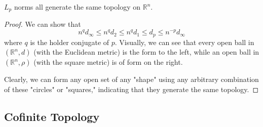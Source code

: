   \begin{theorem}
    $L_p$ norms all generate the same topology on $\mathbb{R}^n$. 
  \end{theorem}
  \begin{proof}
    We can show that 
    \begin{equation}
      n^q d_\infty \leq n^q d_2 \leq n^q d_1 \leq d_p \leq n^{-p} d_\infty
    \end{equation}
    where $q$ is the holder conjugate of $p$. Visually, we can see that every open ball in $(\mathbb{R}^n, d)$ (with the Euclidean metric) is the form to the left, while an open ball in $(\mathbb{R}^n, \rho)$ (with the square metric) is of form on the right. 
    \begin{center}
    \end{center}
    Clearly, we can form any open set of any "shape" using any arbitrary combination of these "circles" or "squares," indicating that they generate the same topology. 
  \end{proof}

\subsection{Cofinite Topology}

